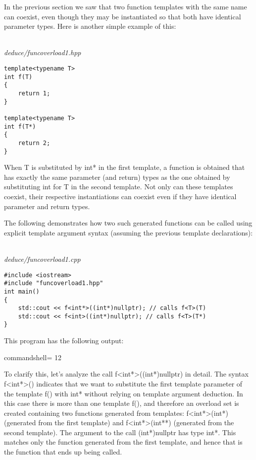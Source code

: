 

In the previous section we saw that two function templates with the same name can coexist, even though they may be instantiated so that both have identical parameter types. Here is another simple example of this:

\hspace*{\fill} \\ %
\noindent
\textit{deduce/funcoverload1.hpp}
\begin{lstlisting}[style=styleCXX]
template<typename T>
int f(T)
{
	return 1;
}

template<typename T>
int f(T*)
{
	return 2;
}
\end{lstlisting}

When T is substituted by int* in the first template, a function is obtained that has exactly the same parameter (and return) types as the one obtained by substituting int for T in the second template. Not only can these templates coexist, their respective instantiations can coexist even if they have identical parameter and return types.

The following demonstrates how two such generated functions can be called using explicit template argument syntax (assuming the previous template declarations):

\hspace*{\fill} \\ %
\noindent
\textit{deduce/funcoverload1.cpp}
\begin{lstlisting}[style=styleCXX]
#include <iostream>
#include "funcoverload1.hpp"
int main()
{
	std::cout << f<int*>((int*)nullptr); // calls f<T>(T)
	std::cout << f<int>((int*)nullptr); // calls f<T>(T*)
}
\end{lstlisting}

This program has the following output:

\begin{tcblisting}{commandshell={}}
12
\end{tcblisting}

To clarify this, let’s analyze the call f<int*>((int*)nullptr) in detail. The syntax f<int*>() indicates that we want to substitute the first template parameter of the template f() with int* without relying on template argument deduction. In this case there is more than one template f(), and therefore an overload set is created containing two functions generated from templates: f<int*>(int*) (generated from the first template) and f<int*>(int**) (generated from the second template). The argument to the call (int*)nullptr has type int*. This matches only the function generated from the first template, and hence that is the function that ends up being called.

